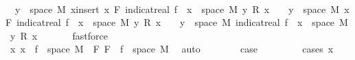 \begin{isabellebody}
\ \ \ \ \isamarkupfalse%
\ {\isacharasterisk}{\kern0pt}{\isacharasterisk}{\kern0pt}{\isacharcolon}{\kern0pt}\ {\isachardoublequoteopen}{\isacharbraceleft}{\kern0pt}y\ {\isasymin}\ space\ M{\isachardot}{\kern0pt}\ {\isacharparenleft}{\kern0pt}{\isasymSum}x{\isasymin}insert\ x\ F{\isachardot}{\kern0pt}\ indicat{\isacharunderscore}{\kern0pt}real\ {\isacharparenleft}{\kern0pt}f\ {\isacharminus}{\kern0pt}{\isacharbackquote}{\kern0pt}\ {\isacharbraceleft}{\kern0pt}x{\isacharbraceright}{\kern0pt}\ {\isasyminter}\ space\ M{\isacharparenright}{\kern0pt}\ y\ {\isacharasterisk}{\kern0pt}\isactrlsub R\ x{\isacharparenright}{\kern0pt}\ {\isasymnoteq}\ {}{\isacharbraceright}{\kern0pt}\ {\isasymsubseteq}\ {\isacharbraceleft}{\kern0pt}y\ {\isasymin}\ space\ M{\isachardot}{\kern0pt}\ {\isacharparenleft}{\kern0pt}{\isasymSum}x{\isasymin}F{\isachardot}{\kern0pt}\ indicat{\isacharunderscore}{\kern0pt}real\ {\isacharparenleft}{\kern0pt}f\ {\isacharminus}{\kern0pt}{\isacharbackquote}{\kern0pt}\ {\isacharbraceleft}{\kern0pt}x{\isacharbraceright}{\kern0pt}\ {\isasyminter}\ space\ M{\isacharparenright}{\kern0pt}\ y\ {\isacharasterisk}{\kern0pt}\isactrlsub R\ x{\isacharparenright}{\kern0pt}\ {\isasymnoteq}\ {}{\isacharbraceright}{\kern0pt}\ {\isasymunion}\ {\isacharbraceleft}{\kern0pt}y\ {\isasymin}\ space\ M{\isachardot}{\kern0pt}\ indicat{\isacharunderscore}{\kern0pt}real\ {\isacharparenleft}{\kern0pt}f\ {\isacharminus}{\kern0pt}{\isacharbackquote}{\kern0pt}\ {\isacharbraceleft}{\kern0pt}x{\isacharbraceright}{\kern0pt}\ {\isasyminter}\ space\ M{\isacharparenright}{\kern0pt}\ y\ {\isacharasterisk}{\kern0pt}\isactrlsub R\ x\ {\isasymnoteq}\ {}{\isacharbraceright}{\kern0pt}{\isachardoublequoteclose}\ \isamarkupfalse%
\ {\isacharasterisk}{\kern0pt}\ \isamarkupfalse%
\ fastforce\ \ \ \ \isanewline
\ \ \ \ \isacommand{{\isacharbraceleft}{\kern0pt}}\isamarkupfalse%
\isanewline
\ \ \ \ \ \ \isamarkupfalse%
\ {}\isanewline
\ \ \ \ \ \ \isamarkupfalse%
\ x{\isacharcolon}{\kern0pt}\ {\isachardoublequoteopen}x\ {\isasymin}\ f\ {\isacharbackquote}{\kern0pt}\ space\ M{\isachardoublequoteclose}\ \ F{\isacharcolon}{\kern0pt}\ {\isachardoublequoteopen}F\ {\isasymsubseteq}\ f\ {\isacharbackquote}{\kern0pt}\ space\ M{\isachardoublequoteclose}\ \isamarkupfalse%
\ auto\isanewline
\ \ \ \ \ \ \isamarkupfalse%
\ {\isacharquery}{\kern0pt}case\ \isanewline
\ \ \ \ \ \ \isamarkupfalse%
\ {\isacharparenleft}{\kern0pt}cases\ {\isachardoublequoteopen}x\ {\isacharequal}{\kern0pt}\ {}{\isachardoublequoteclose}{\isacharparenright}{\kern0pt}\isanewline

\end{isabellebody}
